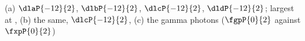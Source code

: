 (a) $\dlaP{-12}{2}$, $\dlbP{-12}{2}$, $\dlcP{-12}{2}$, $\dldP{-12}{2}$; largest at \angdO, (b) the same, $\dlcP{-12}{2}$, (c) the gamma photons ($\fgpP{0}{2}$ against $\fxpP{0}{2}$)
